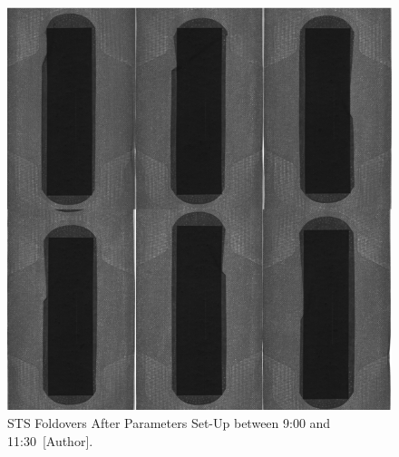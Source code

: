 \begin{figure}[H]
    \centering
    \includegraphics[width=0.5\linewidth]{FIGURES/L15FoldbackAfter.png}
    \caption{STS Foldovers After Parameters Set-Up between 9:00 and 11:30~[Author].}
    \label{AftL15}
\end{figure}

